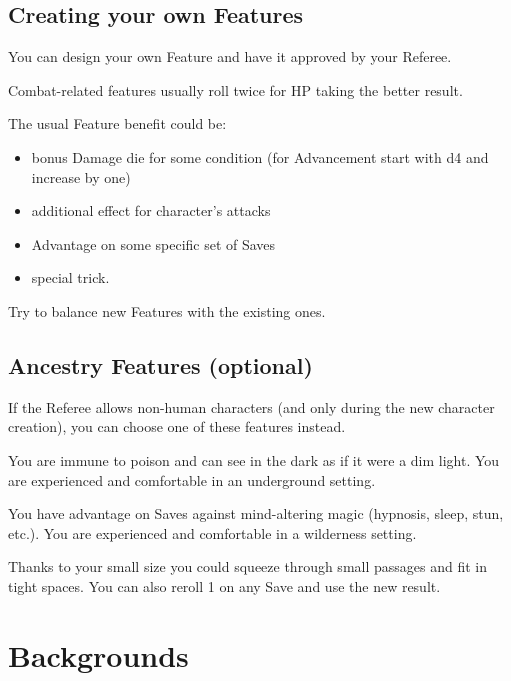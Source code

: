 \documentclass[itdr]{subfiles}
\begin{document}

\begin{dbox}
\subsection*{Creating your own Features}

You can design your own Feature and have it approved by your Referee.

Combat-related features usually roll twice for HP taking the better result.

The usual Feature benefit could be:
\begin{itemize}
	\item bonus Damage die for some condition (for Advancement start with d4 and increase by one)
	\item additional effect for character's attacks
	\item Advantage on some specific set of Saves
	\item special trick.
\end{itemize}

Try to balance new Features with the existing ones.
\end{dbox}

\subsection*{Ancestry Features (optional)}

If the Referee allows non-human characters (and only during the new character creation), you can choose one of these features instead.

You are immune to poison and can see in the dark as if it were a dim light. You are experienced and comfortable in an underground setting.

You have advantage on Saves against mind-altering magic (hypnosis, sleep, stun, etc.). You are experienced and comfortable in a wilderness setting.

Thanks to your small size you could squeeze through small passages and fit in tight spaces. You can also reroll 1 on any Save and use the new result.

\break


\section{Backgrounds}
\end{document}
